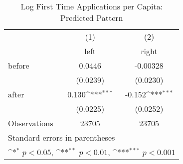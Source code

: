 \begin{table}[htbp]\centering
\def\sym#1{\ifmmode^{#1}\else\(^{#1}\)\fi}
\caption{Log First Time Applications per Capita: Predicted Pattern}
\begin{tabular}{l*{2}{c}}
\hline\hline
                    &\multicolumn{1}{c}{(1)}&\multicolumn{1}{c}{(2)}\\
                    &\multicolumn{1}{c}{left}&\multicolumn{1}{c}{right}\\
\hline
before              &      0.0446         &    -0.00328         \\
                    &    (0.0239)         &    (0.0230)         \\
[1em]
after               &       0.130\sym{***}&      -0.152\sym{***}\\
                    &    (0.0225)         &    (0.0252)         \\
\hline
Observations        &       23705         &       23705         \\
\hline\hline
\multicolumn{3}{l}{\footnotesize Standard errors in parentheses}\\
\multicolumn{3}{l}{\footnotesize \sym{*} \(p<0.05\), \sym{**} \(p<0.01\), \sym{***} \(p<0.001\)}\\
\end{tabular}
\end{table}
